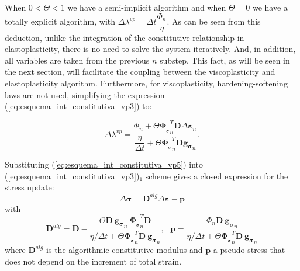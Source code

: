 \documentclass[Journal,letterpaper]{ascelike-new}
\newcommand{\dgds}{\boldsymbol{g_\sigma}}
\newcommand{\dPhidsl}{\boldsymbol{\Phi_{_\sigma}}}
\newcommand{\Dsdee}{\boldsymbol{D}}
\newcommand{\strain}{\boldsymbol{\varepsilon}}
\newcommand{\stress}{\boldsymbol{\sigma}}
\begin{document}
When $0 < \Theta < 1$ we have a semi-implicit algorithm and when $\Theta = 0$ we have a totally explicit algorithm, with $\Delta \lambda^{vp} = \Delta t \dfrac{\Phi_n}{\eta}$. As can be seen from this deduction, unlike the integration of the constitutive relationship in elastoplasticity, there is no need to solve the system iteratively. And, in addition, all variables are taken from the previous $n$ substep. This fact, as will be seen in the next section, will facilitate the coupling between the viscoplasticity and elastoplasticity algorithm. Furthermore, for viscoplasticity, hardening-softening laws are not used, simplifying the expression (\ref{eq:esquema_int_constitutiva_vp3}) to:

\begin{equation}
	\label{eq:esquema_int_constitutiva_vp5}
	\Delta \lambda^{vp} = \dfrac{\Phi_n + \Theta \dPhidsl_n^T\Dsdee\Delta\strain_n}{\dfrac{\eta}{\Delta t} + \Theta \dPhidsl_n^T\Dsdee\dgds_n}.
\end{equation}

Substituting (\ref{eq:esquema_int_constitutiva_vp5}) into (\ref{eq:esquema_int_constitutiva_vp3})$_1$ scheme gives a closed expression for the stress update:
\begin{equation}
	\label{eq:esquema_int_constitutiva_vp6}
	\Delta \stress = \Dsdee^{alg} \Delta \strain - \boldsymbol p
\end{equation}
with
\begin{equation}
	\label{eq:esquema_int_constitutiva_vp6}
	\Dsdee^{alg} = \Dsdee - \dfrac{\Theta \Dsdee~\dgds_n~\dPhidsl_n^T \Dsdee}{\eta/\Delta t+ \Theta \dPhidsl_n^T\Dsdee~\dgds_n},~~~\boldsymbol p = \dfrac{\Phi_n \Dsdee ~\dgds_n}{\eta/\Delta t+ \Theta \dPhidsl_n^T\Dsdee~\dgds_n}
\end{equation}
where $\Dsdee^{alg}$ is the algorithmic constitutive modulus and $\boldsymbol p$ a pseudo-stress that does not depend on the increment of total strain.
\end{document}
